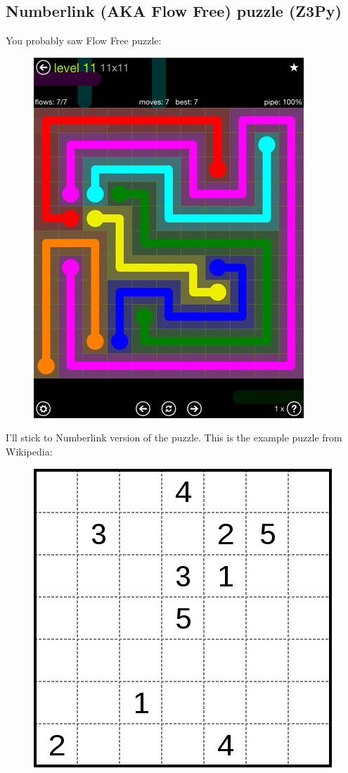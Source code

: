 \subsection{Numberlink (\ac{AKA} Flow Free) puzzle (Z3Py)}

You probably saw Flow Free puzzle:

\begin{figure}[H]
\centering
\includegraphics[scale=0.3]{puzzles/numberlink/Z3/flow-extreme-11-11.png}
\caption{}
\end{figure}

I'll stick to Numberlink version of the puzzle. This is the example puzzle from Wikipedia:

\begin{figure}[H]
\centering
\includegraphics[scale=0.3]{puzzles/numberlink/Z3/424px-Numberlink_puzzle.png}
\caption{}
\end{figure}

